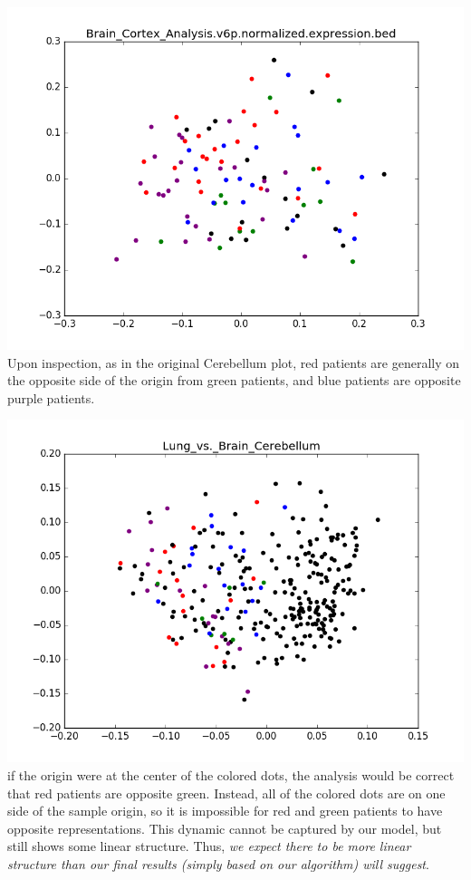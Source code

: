 \documentclass{article}
\begin{document}
\includegraphics[scale = 0.6]{Cerebellum_x_Cortex}
Upon inspection, as in the original Cerebellum plot, red patients are generally on the opposite side of the origin from green patients, and blue patients are opposite purple patients.

\includegraphics[scale = 0.8]{Cerebellum_x_Lung}
if the origin were at the center of the colored dots, the analysis would be correct that red patients are opposite green. Instead, all of the colored dots are on one side of the sample origin, so it is impossible for red and green patients to have opposite representations. This dynamic cannot be captured by our model, but still shows some linear structure. Thus, {\it we expect there to be more linear structure than our final results (simply based on our algorithm) will suggest}.
\end{document}
